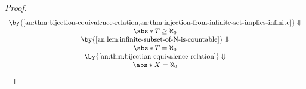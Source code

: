 \begin{proof}
\[\begin{array}{c}
      \by{\Cref{an:thm:bijection-equivalence-relation,an:thm:injection-from-infinite-set-implies-infinite}} \Downarrow \\
      \abs*{T} \geq \aleph_{0}                                                                                         \\
      \by{\Cref{an:lem:infinite-subset-of-N-is-countable}} \Downarrow                                                  \\
      \abs*{T} = \aleph_{0}                                                                                            \\
      \by{\Cref{an:thm:bijection-equivalence-relation}} \Downarrow                                                     \\
      \abs*{X} = \aleph_{0}
    \end{array}
  \]
\end{proof}
